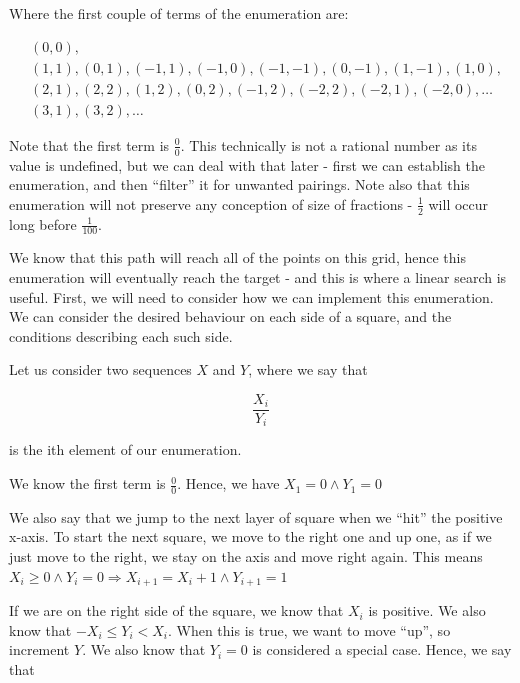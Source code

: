\documentclass{article}
\begin{document}
    Where the first couple of terms of the enumeration are:

    \begin{equation}
    \begin{split}
    &(0, 0),\\
    &(1, 1), (0, 1), (-1, 1), (-1, 0), (-1, -1), (0, -1), (1, -1), (1, 0),\\
    &(2, 1), (2, 2), (1, 2), (0, 2), (-1, 2), (-2, 2), (-2, 1), (-2, 0), \ldots\\
    &(3, 1), (3, 2), \ldots
    \end{split}
    \end{equation}

    Note that the first term is $\frac{0}{0}$. This technically is not a
    rational number as its value is undefined, but we can deal with that later
    - first we can establish the enumeration, and then ``filter'' it for
    unwanted pairings. Note also that this enumeration will not preserve any
    conception of size of fractions - $\frac{1}{2}$ will occur long before
    $\frac{1}{100}$.

    We know that this path will reach all of the points on this grid, hence
    this enumeration will eventually reach the target - and this is where a
    linear search is useful. First, we will need to consider how we can
    implement this enumeration. We can consider the desired behaviour on each
    side of a square, and the conditions describing each such side.

    Let us consider two sequences $X$ and $Y$, where we say that

    \begin{equation}
    \frac{X_i}{Y_i}
    \end{equation}

    is the ith element of our enumeration.

    We know the first term is $\frac{0}{0}$. Hence, we have $X_1 = 0 \wedge Y_1
    = 0$

    We also say that we jump to the next layer of square when we ``hit'' the
    positive x-axis. To start the next square, we move to the right one and up
    one, as if we just move to the right, we stay on the axis and move right
    again. This means $X_i \geq 0 \wedge Y_i = 0 \Rightarrow X_{i +
    1} = X_i + 1 \wedge Y_{i + 1} = 1$

    If we are on the right side of the square, we know that $X_i$ is positive.
    We also know that $-X_i \leq Y_i < X_i$. When this is true, we want to move
    ``up'', so increment $Y$. We also know that $Y_i = 0$ is considered a
    special case. Hence, we say that
\end{document}
